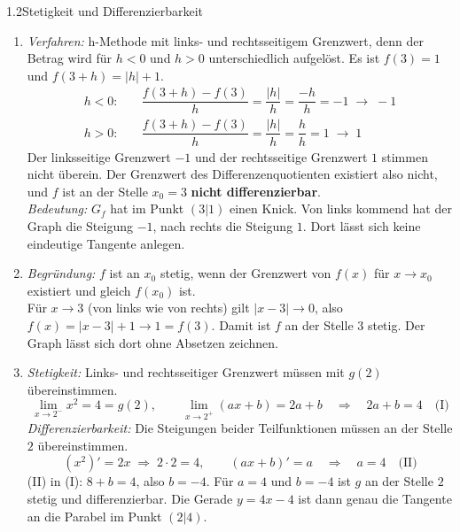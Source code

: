 \begin{loesung}{1.2}{Stetigkeit und Differenzierbarkeit}
\begin{enumerate}[label=\alph*)]
  \item \textit{Verfahren:} h-Methode mit links- und rechtsseitigem Grenzwert, denn der Betrag wird für $h<0$ und $h>0$ unterschiedlich aufgelöst. Es ist $f(3)=1$ und $f(3+h) = |h|+1$.
  \begin{align*}
    h<0:&\quad \dfrac{f(3+h)-f(3)}{h} = \dfrac{|h|}{h} = \dfrac{-h}{h} = -1 \;\longrightarrow\; -1\\
    h>0:&\quad \dfrac{f(3+h)-f(3)}{h} = \dfrac{|h|}{h} = \dfrac{h}{h} = 1 \;\longrightarrow\; 1
  \end{align*}
  Der linksseitige Grenzwert $-1$ und der rechtsseitige Grenzwert $1$ stimmen nicht überein. Der Grenzwert des Differenzenquotienten existiert also nicht, und $f$ ist an der Stelle $x_0=3$ \textbf{nicht differenzierbar}.\\
  \textit{Bedeutung:} $G_f$ hat im Punkt $(3|1)$ einen \glqq Knick\grqq{}. Von links kommend hat der Graph die Steigung $-1$, nach rechts die Steigung $1$. Dort lässt sich keine eindeutige Tangente anlegen.
  \item \textit{Begründung:} $f$ ist an $x_0$ stetig, wenn der Grenzwert von $f(x)$ für $x\longrightarrow x_0$ existiert und gleich $f(x_0)$ ist.\\
  Für $x\longrightarrow 3$ (von links wie von rechts) gilt $|x-3|\longrightarrow 0$, also $f(x) = |x-3|+1\longrightarrow 1 = f(3)$. Damit ist $f$ an der Stelle $3$ stetig. Der Graph lässt sich dort \glqq ohne Absetzen\grqq{} zeichnen.
  \item \textit{Stetigkeit:} Links- und rechtsseitiger Grenzwert müssen mit $g(2)$ übereinstimmen.
  \[\lim\limits_{x\longrightarrow 2^-} x^2 = 4 = g(2),\qquad \lim\limits_{x\longrightarrow 2^+}(ax+b) = 2a+b \quad\Longrightarrow\quad 2a+b = 4 \quad\text{(I)}\]
  \textit{Differenzierbarkeit:} Die Steigungen beider Teilfunktionen müssen an der Stelle $2$ übereinstimmen.
  \[(x^2)' = 2x \;\Rightarrow\; 2\cdot 2 = 4,\qquad (ax+b)' = a \quad\Longrightarrow\quad a = 4 \quad\text{(II)}\]
  (II) in (I): $8+b=4$, also $b=-4$. Für $a=4$ und $b=-4$ ist $g$ an der Stelle $2$ stetig und differenzierbar. Die Gerade $y=4x-4$ ist dann genau die Tangente an die Parabel im Punkt $(2|4)$.
\end{enumerate}
\end{loesung}

